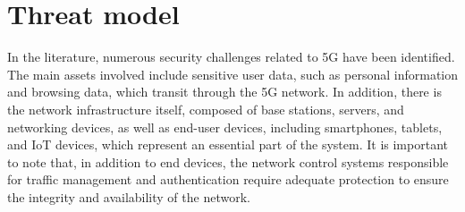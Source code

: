 \documentclass[english]{article}
\begin{document}
\section{Threat model}\label{sec:ThreatModel}
In the literature, numerous security challenges related to 5G have been
identified. The main assets involved include sensitive user data, such as
personal information and browsing data, which transit through the 5G network.
In addition, there is the network infrastructure itself, composed of base
stations, servers, and networking devices, as well as end-user devices,
including smartphones, tablets, and IoT devices, which represent an essential
part of the system. It is important to note that, in addition to end devices,
the network control systems responsible for traffic management and
authentication require adequate protection to ensure the integrity and
availability of the network.
\end{document}
